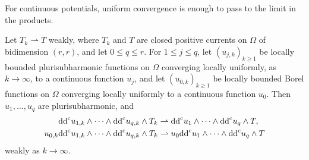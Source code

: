For continuous potentials, uniform convergence is enough to pass to the limit in the products.

\begin{proposition}\label{prop:bt-uniform-continuity}
Let $T_k\rightharpoonup T$ weakly, where $T_k$ and $T$ are closed positive currents on $\Omega$ of bidimension $(r,r)$, and let $0\le q\le r$. For $1\le j\le q$, let $(u_{j,k})_{k\ge1}$ be locally bounded plurisubharmonic functions on $\Omega$ converging locally uniformly, as $k\to\infty$, to a continuous function $u_j$, and let $(u_{0,k})_{k\ge1}$ be locally bounded Borel functions on $\Omega$ converging locally uniformly to a continuous function $u_0$. Then $u_1,\ldots,u_q$ are plurisubharmonic, and
\[
 \begin{aligned}
 \mathrm{dd}^{\mathrm{c}} u_{1,k}\wedge\cdots\wedge\mathrm{dd}^{\mathrm{c}} u_{q,k}\wedge T_k
 &\rightharpoonup\mathrm{dd}^{\mathrm{c}} u_1\wedge\cdots\wedge\mathrm{dd}^{\mathrm{c}} u_q\wedge T,\\
 u_{0,k}\mathrm{dd}^{\mathrm{c}} u_{1,k}\wedge\cdots\wedge\mathrm{dd}^{\mathrm{c}} u_{q,k}\wedge T_k
 &\rightharpoonup u_0\mathrm{dd}^{\mathrm{c}} u_1\wedge\cdots\wedge\mathrm{dd}^{\mathrm{c}} u_q\wedge T
 \end{aligned}
\]
weakly as $k\to\infty$.
\end{proposition}
